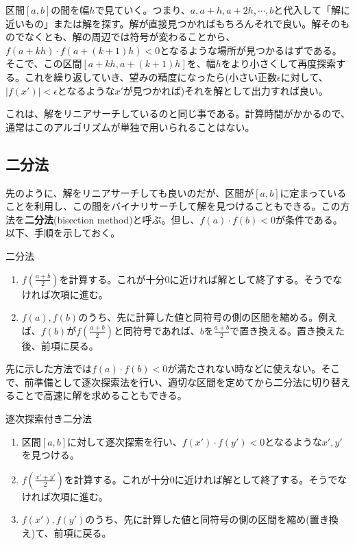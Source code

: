 区間$[a,b]$の間を幅$h$で見ていく。つまり、$a,a+h,a+2h,\cdots,b$と代入して「解に近いもの」または解を探す。解が直接見つかればもちろんそれで良い。解そのものでなくとも、解の周辺では符号が変わることから、$f(a+kh)\cdot f(a+(k+1)h)<0$となるような場所が見つかるはずである。そこで、この区間$[a+kh,a+(k+1)h]$を、幅$h$をより小さくして再度探索する。これを繰り返していき、望みの精度になったら(小さい正数$\epsilon$に対して、$|f(x')|<\epsilon$となるような$x'$が見つかれば)それを解として出力すれば良い。

これは、解をリニアサーチしているのと同じ事である。計算時間がかかるので、通常はこのアルゴリズムが単独で用いられることはない。

\subsection{二分法}
先のように、解をリニアサーチしても良いのだが、区間が$[a,b]$に定まっていることを利用し、この間をバイナリサーチして解を見つけることもできる。この方法を\textbf{二分法}(bisection method)と呼ぶ。但し、$f(a)\cdot f(b)<0$が条件である。以下、手順を示しておく。
\begin{itembox}[l]{二分法}
\begin{enumerate}
\item $f\left(\frac{a+b}{2}\right)$を計算する。これが十分0に近ければ解として終了する。そうでなければ次項に進む。
\item $f(a),f(b)$のうち、先に計算した値と同符号の側の区間を縮める。例えば、$f(b)$が$f\left(\frac{a+b}{2}\right)$と同符号であれば、$b$を$\frac{a+b}{2}$で置き換える。置き換えた後、前項に戻る。
\end{enumerate}
\end{itembox}

先に示した方法では$f(a)\cdot f(b)<0$が満たされない時などに使えない。そこで、前準備として逐次探索法を行い、適切な区間を定めてから二分法に切り替えることで高速に解を求めることもできる。
\begin{itembox}[l]{逐次探索付き二分法}
\begin{enumerate}
\item 区間$[a,b]$に対して逐次探索を行い、$f(x')\cdot f(y')<0$となるような$x',y'$を見つける。
\item $f\left(\frac{x'+y'}{2}\right)$を計算する。これが十分0に近ければ解として終了する。そうでなければ次項に進む。
\item $f(x'),f(y')$のうち、先に計算した値と同符号の側の区間を縮め(置き換え)て、前項に戻る。
\end{enumerate}
\end{itembox}

